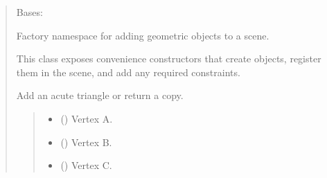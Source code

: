 \documentclass[letterpaper,10pt,english]{sphinxmanual}
\begin{document}
\begin{quote}
\begin{fulllineitems}
\label{\detokenize{pygeox:pygeox.add_objects.AddNamespace}}
\pysigstartsignatures
\pysiglinewithargsret
{}
{}
{}
\pysigstopsignatures
\sphinxAtStartPar
Bases: 

\sphinxAtStartPar
Factory namespace for adding geometric objects to a scene.

\sphinxAtStartPar
This class exposes convenience constructors that create objects,
register them in the scene, and add any required constraints.

\begin{fulllineitems}
\label{\detokenize{pygeox:pygeox.add_objects.AddNamespace.acute_triangle}}
\pysigstartsignatures
\pysiglinewithargsret
{}
{\sphinxparamcomma {}\sphinxparamcomma {}\sphinxparamcomma {}\sphinxparamcomma {}}
{}
\pysigstopsignatures
\sphinxAtStartPar
Add an acute triangle or return a copy.
\begin{quote}\begin{description}
\begin{itemize}
\item {} 
\sphinxAtStartPar
{} (\sphinxstyleliteralemphasis{\sphinxupquote{ | }}) \textendash{} Vertex A.

\item {} 
\sphinxAtStartPar
{} (\sphinxstyleliteralemphasis{\sphinxupquote{ | }}) \textendash{} Vertex B.

\item {} 
\sphinxAtStartPar
{} (\sphinxstyleliteralemphasis{\sphinxupquote{ | }}) \textendash{} Vertex C.


\end{itemize}
\end{description}
\end{quote}
\end{fulllineitems}
\end{fulllineitems}
\end{quote}
\end{document}
